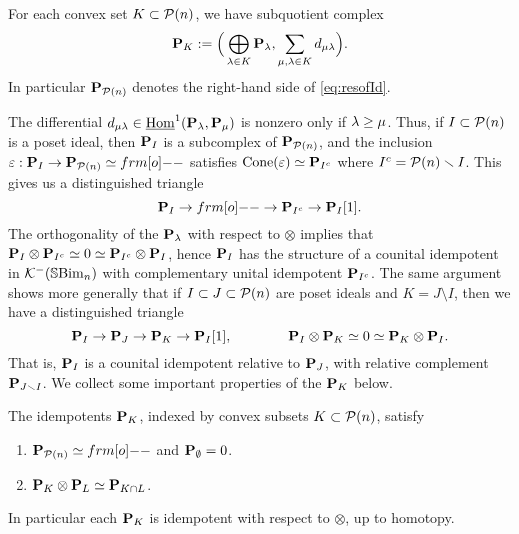 \begin{definition}\label{def:PK}
For each convex set $K\subset {\mathcal{P}}(n)$, we have subquotient complex
\[
{\mathbf P}_K:= \Big(\bigoplus_{\lambda\in K}{\mathbf P}_\lambda, \sum_{\mu,\lambda\in K} d_{\mu\lambda}\Big).
\]
In particular ${\mathbf P}_{{\mathcal{P}}(n)}$ denotes the right-hand side of \eqref{eq:resofId}. 
\end{definition}

The differential $d_{\mu\lambda}\in \underline{\operatorname{Hom}}^{1}({\mathbf P}_\lambda,{\mathbf P}_\mu)$ is nonzero only if $\lambda\geq \mu$.  Thus, if $I\subset {\mathcal{P}}(n)$ is a poset ideal, then ${\mathbf P}_I$ is a subcomplex of ${\mathbf P}_{{\mathcal{P}}(n)}$, and the inclusion $\e:\PB_I\rightarrow \PB_{\PC(n)}\simeq \one$ satisfies $\operatorname{Cone}(\varepsilon)\simeq {\mathbf P}_{I^c}$ where $I^c = {\mathcal{P}}(n)\smallsetminus I$.  This gives us a distinguished triangle
\[
\PB_I\rightarrow \one\rightarrow \PB_{I^c}\rightarrow \PB_I[1].
\]
The orthogonality of the ${\mathbf P}_\lambda$ with respect to $\otimes$ implies that ${\mathbf P}_I \otimes {\mathbf P}_{I^c}\simeq 0 \simeq {\mathbf P}_{I^c} \otimes {\mathbf P}_I$, hence ${\mathbf P}_I$ has the structure of a counital idempotent in ${\mathcal{K}}^-({\mathbb{S}}{\rm Bim }_n)$ with complementary unital idempotent ${\mathbf P}_{I^c}$.  The same argument shows more generally that if $I\subset J\subset {\mathcal{P}}(n)$ are poset ideals and $K=J\setminus I$, then we have a distinguished triangle
\[
{\mathbf P}_I\rightarrow {\mathbf P}_J\rightarrow {\mathbf P}_K\rightarrow {\mathbf P}_I[1],\qquad\qquad {\mathbf P}_I\otimes {\mathbf P}_K\simeq 0 \simeq {\mathbf P}_K\otimes{\mathbf P}_I.
\]
That is, ${\mathbf P}_I$ is a counital idempotent relative to ${\mathbf P}_J$, with relative complement ${\mathbf P}_{J\smallsetminus I}$.   We collect some important properties of the ${\mathbf P}_K$ below.

\begin{lemma}\label{lemma:PK}
The idempotents ${\mathbf P}_K$, indexed by convex subsets $K\subset {\mathcal{P}}(n)$, satisfy
\begin{enumerate}
\item $\PB_{\PC(n)}\simeq \one$ and ${\mathbf P}_\emptyset = 0$.
\item ${\mathbf P}_K\otimes {\mathbf P}_L\simeq {\mathbf P}_{K\cap L}$.
\end{enumerate}
In particular each ${\mathbf P}_K$ is idempotent with respect to $\otimes$, up to homotopy.
\end{lemma}

